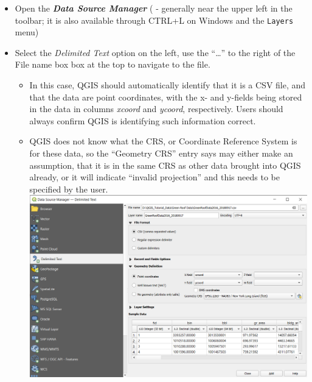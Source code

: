 \documentclass[
  letterpaper,
  DIV=11,
  numbers=noendperiod]{scrreprt}
\providecommand{\tightlist}{%
  \setlength{\itemsep}{0pt}\setlength{\parskip}{0pt}}\usepackage{longtable,booktabs,array}
\begin{document}
\begin{itemize}
\tightlist
\item
  Open the \textbf{\emph{Data Source Manager}}
  ( -
  generally near the upper left in the toolbar; it is also available
  through CTRL+L on Windows and the \texttt{Layers} menu)
\item
  Select the \emph{Delimited Text} option on the left, use the
  ``\ldots{}'' to the right of the File name box box at the top to
  navigate to the file.

  \begin{itemize}
  \tightlist
  \item
    In this case, QGIS should automatically identify that it is a CSV
    file, and that the data are point coordinates, with the x- and
    y-fields being stored in the data in columns \emph{xcoord} and
    \emph{ycoord}, respectively. Users should always confirm QGIS is
    identifying such information correct.
  \item
    QGIS does not know what the CRS, or Coordinate Reference System is
    for these data, so the ``Geometry CRS'' entry says may either make
    an assumption, that it is in the same CRS as other data brought into
    QGIS already, or it will indicate ``invalid projection'' and this
    needs to be specified by the user.
    \includegraphics{./images/Load_CSV_PointData.png}


\end{itemize}
\end{itemize}
\end{document}
